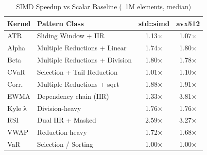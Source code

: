 \begin{table}[ht]
\centering
\caption{SIMD Speedup vs Scalar Baseline (~1M elements, median)}
\label{tab:main-results}
\begin{tabular}{@{}l l cc@{}}
\toprule
\textbf{Kernel} & \textbf{Pattern Class} & \textbf{std::simd} & \textbf{avx512} \\
\midrule
ATR & Sliding Window + IIR & 1.13× & 1.07× \\
Alpha & Multiple Reductions + Linear & 1.74× & 1.80× \\
Beta & Multiple Reductions + Division & 1.80× & 1.78× \\
CVaR & Selection + Tail Reduction & 1.01× & 1.10× \\
Corr. & Multiple Reductions + sqrt & 1.88× & 1.91× \\
EWMA & Dependency chain (IIR) & 1.33× & 3.81× \\
Kyle λ & Division-heavy & 1.76× & 1.76× \\
RSI & Dual IIR + Masked & 2.59× & 3.27× \\
VWAP & Reduction-heavy & 1.72× & 1.68× \\
VaR & Selection / Sorting & 1.00× & 1.00× \\
\bottomrule
\end{tabular}
\end{table}